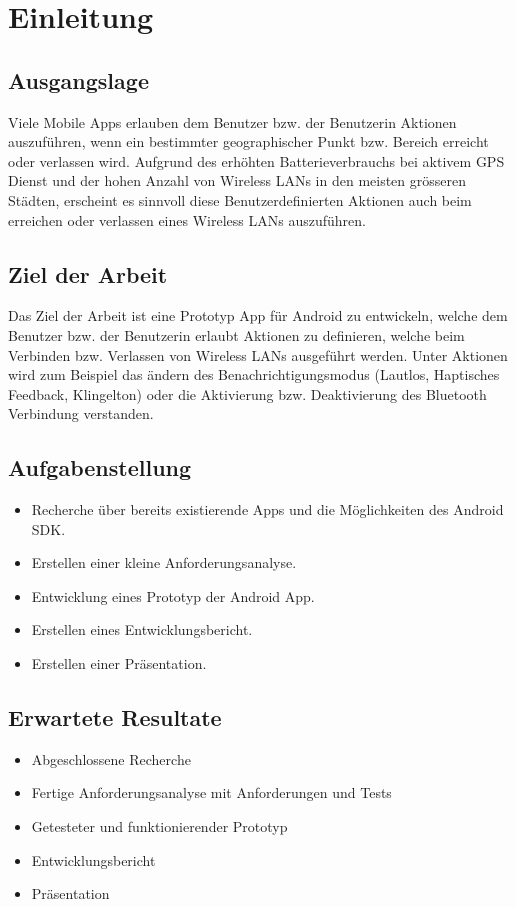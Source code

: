 \chapter{Einleitung}
\label{sec:Einleitung}

\section{Ausgangslage}
\label{sec:Ausgangslage}

Viele Mobile Apps erlauben dem Benutzer bzw. der Benutzerin Aktionen auszuführen, wenn ein bestimmter geographischer Punkt bzw. Bereich erreicht oder verlassen wird. Aufgrund des erhöhten Batterieverbrauchs bei aktivem GPS Dienst und der hohen Anzahl von Wireless LANs in den meisten grösseren Städten, erscheint es sinnvoll diese Benutzerdefinierten Aktionen auch beim erreichen oder verlassen eines Wireless LANs auszuführen.

\section{Ziel der Arbeit}
\label{sec:zielderarbeit}
Das Ziel der Arbeit ist eine Prototyp App für Android zu entwickeln, welche dem Benutzer bzw. der Benutzerin erlaubt Aktionen zu definieren, welche beim Verbinden bzw. Verlassen von Wireless LANs ausgeführt werden. Unter Aktionen wird zum Beispiel das ändern des Benachrichtigungsmodus (Lautlos, Haptisches Feedback, Klingelton) oder die Aktivierung bzw. Deaktivierung des Bluetooth Verbindung verstanden.

\section{Aufgabenstellung}
\label{sec:aufgabenstellung}
\begin{itemize}
  \item Recherche über bereits existierende Apps und die Möglichkeiten des Android SDK.
  \item Erstellen einer kleine Anforderungsanalyse.
  \item Entwicklung eines Prototyp der Android App.
  \item Erstellen eines Entwicklungsbericht.
  \item Erstellen einer Präsentation.
\end{itemize}

\section{Erwartete Resultate}
\label{sec:erwarteteresultate}
\begin{itemize}
  \item Abgeschlossene Recherche
  \item Fertige Anforderungsanalyse mit Anforderungen und Tests
  \item Getesteter und funktionierender Prototyp
  \item Entwicklungsbericht
  \item Präsentation
\end{itemize}